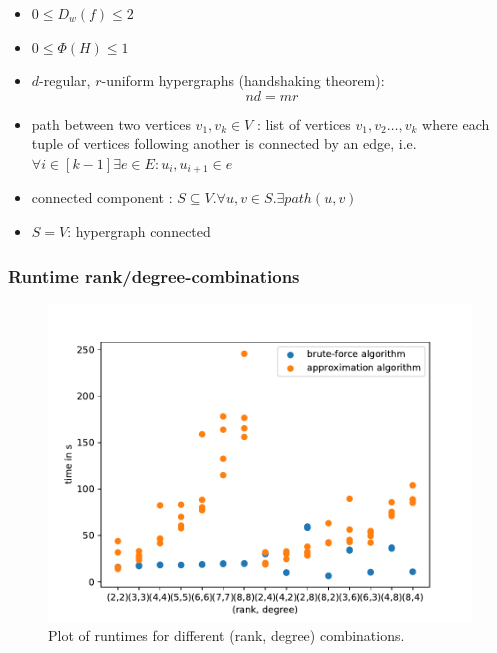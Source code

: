\documentclass{beamer}
\begin{document}
\begin{frame}\begin{itemize}
							\item  $0\le D_w(f) \le 2 $ \cite{ChanLTZ16}
							\item $0\le \Phi(H)\le 1$ 
							
							
							
							\item  $d$-regular, $r$-uniform hypergraphs (handshaking theorem):
							\begin{equation}\label{eq:ndmr}
							n d = m r
							\end{equation}
							
							
							
							\item  path between two vertices $v_1,v_k\in V$ : list of vertices $v_1, v_2 \ldots , v_k$ where each tuple of vertices following another is connected by an edge, i.e. $\forall i \in [k-1]\exists e \in E: u_i, u_{i+1} \in e  $
							\item  connected component :  $S\subseteq V. \forall u,v \in S . \exists path(u,v)$
							\item  $S=V$: hypergraph connected
\end{itemize}

\end{frame}


\begin{frame}
\frametitle{Runtime rank/degree-combinations}
\begin{figure}[H]
	\centering
	\includegraphics[scale=0.5]{figures/rank_degree_combinations_all_logs.pdf}
	\caption[Plot rank degree combinations against time]{Plot of runtimes for different (rank, degree) combinations.\label{fig:rank_degree_times}}
\end{figure}
\end{frame}
\end{document}
